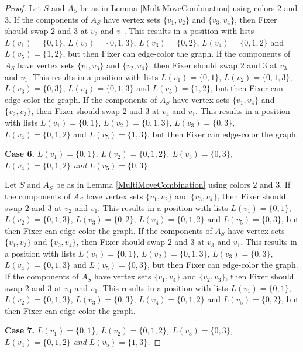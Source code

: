 \documentclass[12pt]{amsart}
\theoremstyle{plain}
\theoremstyle{definition}
\theoremstyle{remark}
\begin{document}
\begin{proof}
Let $S$ and $A_S$ be as in Lemma \ref{MultiMoveCombination} using colors $2$ and $3$. If the components of $A_S$ have vertex sets $\{v_1, v_2\}$ and $\{v_3, v_4\}$, then Fixer should swap 2 and 3 at $v_2$ and $v_1$. This results in a position with lists $L(v_1) = \{0, 1\}$, $L(v_2) = \{0, 1, 3\}$, $L(v_3) = \{0, 2\}$, $L(v_4) = \{0, 1, 2\}$ and $L(v_5) = \{1, 2\}$, but then Fixer can edge-color the graph.
If the components of $A_S$ have vertex sets $\{v_1, v_3\}$ and $\{v_2, v_4\}$, then Fixer should swap 2 and 3 at $v_3$ and $v_1$. This results in a position with lists $L(v_1) = \{0, 1\}$, $L(v_2) = \{0, 1, 3\}$, $L(v_3) = \{0, 3\}$, $L(v_4) = \{0, 1, 3\}$ and $L(v_5) = \{1, 2\}$, but then Fixer can edge-color the graph.
If the components of $A_S$ have vertex sets $\{v_1, v_4\}$ and $\{v_2, v_3\}$, then Fixer should swap 2 and 3 at $v_4$ and $v_1$. This results in a position with lists $L(v_1) = \{0, 1\}$, $L(v_2) = \{0, 1, 3\}$, $L(v_3) = \{0, 3\}$, $L(v_4) = \{0, 1, 2\}$ and $L(v_5) = \{1, 3\}$, but then Fixer can edge-color the graph.

\noindent\textbf{Case 6.  }\textit{$L(v_1) = \{0, 1\}$, $L(v_2) = \{0, 1, 2\}$, $L(v_3) = \{0, 3\}$, $L(v_4) = \{0, 1, 2\}$ and $L(v_5) = \{0, 3\}$.}

Let $S$ and $A_S$ be as in Lemma \ref{MultiMoveCombination} using colors $2$ and $3$. If the components of $A_S$ have vertex sets $\{v_1, v_2\}$ and $\{v_3, v_4\}$, then Fixer should swap 2 and 3 at $v_2$ and $v_1$. This results in a position with lists $L(v_1) = \{0, 1\}$, $L(v_2) = \{0, 1, 3\}$, $L(v_3) = \{0, 2\}$, $L(v_4) = \{0, 1, 2\}$ and $L(v_5) = \{0, 3\}$, but then Fixer can edge-color the graph.
If the components of $A_S$ have vertex sets $\{v_1, v_3\}$ and $\{v_2, v_4\}$, then Fixer should swap 2 and 3 at $v_3$ and $v_1$. This results in a position with lists $L(v_1) = \{0, 1\}$, $L(v_2) = \{0, 1, 3\}$, $L(v_3) = \{0, 3\}$, $L(v_4) = \{0, 1, 3\}$ and $L(v_5) = \{0, 3\}$, but then Fixer can edge-color the graph.
If the components of $A_S$ have vertex sets $\{v_1, v_4\}$ and $\{v_2, v_3\}$, then Fixer should swap 2 and 3 at $v_4$ and $v_1$. This results in a position with lists $L(v_1) = \{0, 1\}$, $L(v_2) = \{0, 1, 3\}$, $L(v_3) = \{0, 3\}$, $L(v_4) = \{0, 1, 2\}$ and $L(v_5) = \{0, 2\}$, but then Fixer can edge-color the graph.

\noindent\textbf{Case 7.  }\textit{$L(v_1) = \{0, 1\}$, $L(v_2) = \{0, 1, 2\}$, $L(v_3) = \{0, 3\}$, $L(v_4) = \{0, 1, 2\}$ and $L(v_5) = \{1, 3\}$.}


\end{proof}
\end{document}
